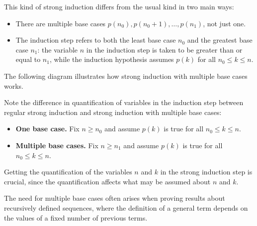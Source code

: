 This kind of strong induction differs from the usual kind in two main ways:
\begin{itemize}
\item There are multiple base cases $p(n_0), p(n_0+1), \dots, p(n_1)$, not just one.
\item The induction step refers to both the least base case $n_0$ and the greatest base case $n_1$: the variable $n$ in the induction step is taken to be greater than or equal to $n_1$, while the induction hypothesis assumes $p(k)$ for all $n_0 \le k \le n$.
\end{itemize}

The following diagram illustrates how strong induction with multiple base cases works.

\begin{center}
\end{center}

Note the difference in quantification of variables in the induction step between regular strong induction and strong induction with multiple base cases:
\begin{itemize}
\item \textbf{One base case.} Fix $n \ge \boxed{n_0}$ and assume $p(k)$ is true for all $\boxed{n_0} \le k \le n$.
\item \textbf{Multiple base cases.} Fix $n \ge \boxed{n_1}$ and assume $p(k)$ is true for all $\boxed{n_0} \le k \le n$.
\end{itemize}

Getting the quantification of the variables $n$ and $k$ in the strong induction step is crucial, since the quantification affects what may be assumed about $n$ and $k$.

The need for multiple base cases often arises when proving results about recursively defined sequences, where the definition of a general term depends on the values of a fixed number of previous terms.

